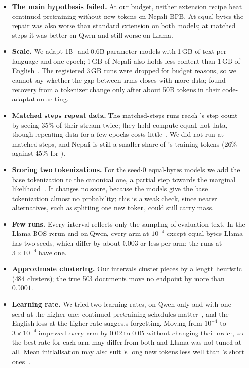 \begin{itemize}
  \setlength\itemsep{0pt}
  \item \textbf{The main hypothesis failed.} At our budget, neither extension recipe beat continued pretraining without new tokens on Nepali BPB. At equal bytes the repair was also worse than standard extension on both models; at matched steps it was better on Qwen and still worse on Llama.
  \item \textbf{Scale.} We adapt 1B- and 0.6B-parameter models with 1\,GB of text per language and one epoch; 1\,GB of Nepali also holds less content than 1\,GB of English~\citep{arnett-etal-2024-bit}. The registered 3\,GB runs were dropped for budget reasons, so we cannot say whether the gap between arms closes with more data; \citet{dagan2024getting} found recovery from a tokenizer change only after about 50B tokens in their code-adaptation setting.
  \item \textbf{Matched steps repeat data.} The matched-steps \RII{} runs reach \RI{}'s step count by seeing 35\% of their stream twice; they hold compute equal, not data, though repeating data for a few epochs costs little~\citep{muennighoff2023scaling}. We did not run \RO{} at matched steps, and Nepali is still a smaller share of \RII{}'s training tokens (26\% against 45\% for \RI{}).
  \item \textbf{Scoring two tokenizations.} For the seed-0 equal-bytes models we add the base tokenization to the canonical one, a partial step towards the marginal likelihood~\citep{cao-rimell-2021-evaluate,chirkova-etal-2023-marginalize}. It changes no score, because the models give the base tokenization almost no probability; this is a weak check, since nearer alternatives, such as splitting one new token, could still carry mass.
  \item \textbf{Few runs.} Every interval reflects only the sampling of evaluation text. In the Llama BOS rerun and on Qwen, every arm at $10^{-4}$ except equal-bytes Llama \RII{} has two seeds, which differ by about $0.003$ or less per arm; the runs at $3{\times}10^{-4}$ have one.
  \item \textbf{Approximate clustering.} Our intervals cluster pieces by a length heuristic (484 clusters); the true 503 documents move no endpoint by more than $0.0001$.
  \item \textbf{Learning rate.} We tried two learning rates, on Qwen only and with one seed at the higher one; continued-pretraining schedules matter~\citep{ibrahim2024simple}, and the English loss at the higher rate suggests forgetting. Moving from $10^{-4}$ to $3{\times}10^{-4}$ improved every arm by $0.02$ to $0.05$ without changing their order, so the best rate for each arm may differ from both and Llama was not tuned at all. Mean initialisation may also suit \RII{}'s long new tokens less well than \RI{}'s short ones~\citep{joshi2026beyondinit}.

\end{itemize}
